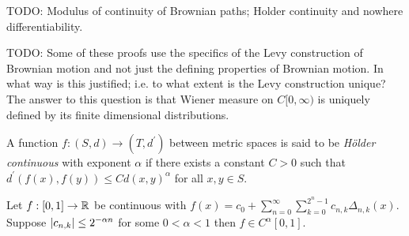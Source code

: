 TODO: Modulus of continuity of Brownian paths; Holder continuity and
nowhere differentiability.

TODO: Some of these proofs use the specifics of the Levy construction
of Brownian motion and not just the defining properties of Brownian
motion.  In what way is this justified; i.e. to what extent is the
Levy construction unique?  The answer to this question is that Wiener
measure on $C[0,\infty)$ is uniquely defined by its finite dimensional
distributions.

\begin{defn}A function $f : (S, d) \to (T, d^\prime)$ between metric
  spaces is said to be \emph{H\"older continuous} with exponent
  $\alpha$ if there exists a constant $C > 0$ such that
  $d^\prime(f(x), f(y)) \leq C d(x,y)^\alpha$ for all $x, y \in S$.  
\end{defn}
\begin{lem}\label{HaarWaveletCoefficientHolderContinuity}Let $f : [0,1] \to \mathbb{R}$ be continuous with $f(x) = c_0 +
  \sum_{n=0}^\infty \sum_{k=0}^{2^n -1} c_{n,k} \Delta_{n,k}(x)$.  Suppose $\left \vert c_{n,k} \right \vert \leq
  2^{-\alpha n}$ for some $0 < \alpha < 1$ then $f \in C^{\alpha}[0,1]$.
\end{lem}
